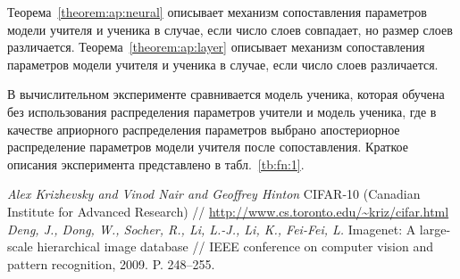\documentclass[12pt]{a&t}
\begin{document}
Теорема~\ref{theorem:ap:neural} описывает механизм сопоставления параметров модели учителя и ученика в случае, если число слоев совпадает, но размер слоев различается. Теорема~\ref{theorem:ap:layer} описывает механизм сопоставления параметров модели учителя и ученика в случае, если число слоев различается.

В вычислительном эксперименте сравнивается модель ученика, которая обучена без использования распределения параметров учители и модель ученика, где в качестве априорного распределения параметров выбрано апостериорное распределение параметров модели учителя после сопоставления. Краткое описания эксперимента представлено в табл.~\ref{tb:fn:1}.

\begin{thebibliography}{10}
	\textit{Alex Krizhevsky and Vinod Nair and Geoffrey Hinton} CIFAR-10 (Canadian Institute for Advanced Research) // \url{http://www.cs.toronto.edu/~kriz/cifar.html}
	\textit{Deng, J., Dong, W., Socher, R., Li, L.-J., Li, K., Fei-Fei, L. } Imagenet: A large-scale hierarchical image database //  IEEE conference on computer vision and pattern recognition, 2009. P. 248--255. 
	

\end{thebibliography}
\end{document}
